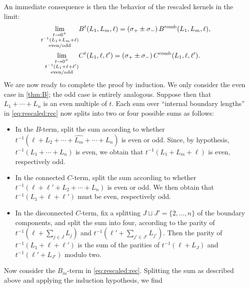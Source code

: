 \documentclass[a4paper,11pt,english]{article}
\theoremstyle{plain}
\theoremstyle{definition}
\theoremstyle{plain}
\begin{document}
An immediate consequence is then the behavior of the rescaled kernels in the limit:
\begin{equation}
\begin{aligned}
    \lim_{\substack{t \to 0^+ \\ t^{-1}(L_1+L_m+\ell) \\ \textup{even/odd}}} & B^{t}(L_1,L_m,\ell)
    =
    (\sigma_+ \pm \sigma_-) \, B^{\textup{comb}}(L_1,L_m,\ell), \\
    \lim_{\substack{t \to 0^+ \\ t^{-1}(L_1+\ell+\ell') \\ \textup{even/odd}}} & C^{t}(L_1,\ell,\ell')
    =
    (\sigma_+ \pm \sigma_-) \, C^{\textup{comb}}(L_1,\ell,\ell') .
\end{aligned}
\end{equation}
We are now ready to complete the proof by induction. We only consider the even case in \cref{thm:B}; the odd case is entirely analogous. Suppose then that $L_1 + \cdots + L_n$ is an even multiple of $t$. Each sum over ``internal boundary lengths'' in \cref{eq:rescaled:rec} now splits into two or four possible sums as follows:
\begin{itemize}
    \item In the $B$-term, split the sum according to whether $t^{-1}(\ell + L_2 + \cdots + \widehat{L_m} + \cdots + L_n)$ is even or odd. Since, by hypothesis, $t^{-1}(L_1 + \cdots + L_n)$ is even, we obtain that $t^{-1}(L_1 + L_m + \ell)$ is even, respectively odd.
    
    \item In the connected $C$-term, split the sum according to whether $t^{-1}(\ell + \ell' + L_2 + \cdots + L_n)$ is even or odd. We then obtain that $t^{-1}(L_1 + \ell + \ell')$ must be even, respectively odd.
    
    \item In the disconnected $C$-term, fix a splitting $J \sqcup J' = \{2,\ldots,n\}$ of the boundary components, and split the sum into four, according to the parity of $t^{-1}(\ell + \sum_{j \in J} L_j)$ and $t^{-1}(\ell' + \sum_{j' \in J'} L_{j'})$. Then the parity of $t^{-1}(L_1 + \ell + \ell')$ is the sum of the parities of $t^{-1}(\ell + L_J)$ and $t^{-1}(\ell' + L_{J'})$ modulo two.
\end{itemize}
Now consider the $B_m$-term in \cref{eq:rescaled:rec}. Splitting the sum as described above and applying the induction hypothesis, we find
\end{document}
